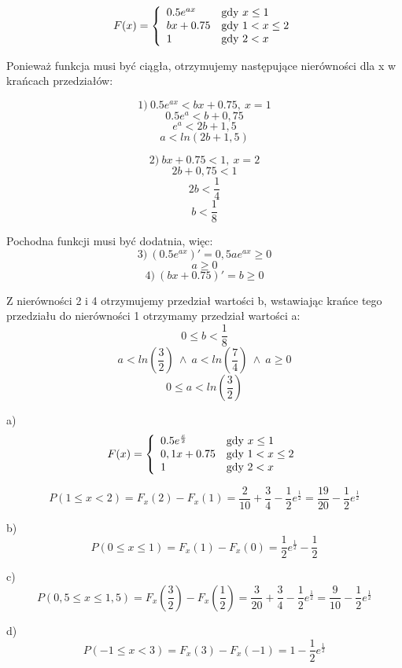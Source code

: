\medskip
{} 

$$
F(x)
 = \left\{ \begin{array}{ll}
0.5 e^{ax} & \textrm{gdy $x \leq 1$}\\
bx+0.75 & \textrm{gdy $ 1 < x \leq 2 $}\\
1 & \textrm{gdy $2 < x$}
\end{array} \right.
$$

Ponieważ funkcja musi być ciągła, otrzymujemy następujące nierówności dla x w krańcach przedziałów:

$$    
 1) \:0.5 e^{ax}<bx+0.75,\: x=1 $$
$$0.5 e^{a}<b+0,75$$
$$ e^{a}<2b+1,5$$
$$a<ln(2b+1,5)$$

$$2) \:bx+0.75<1,\: x=2$$
$$2b+0,75<1$$
$$2b<\frac{1}{4}$$
$$b<\frac{1}{8}$$

Pochodna funkcji musi być dodatnia, więc:
$$3) \: (0.5 e^{ax})' = 0,5a e^{ax} \geq 0$$
$$a\geq 0$$
$$4) \: (bx+0.75)'=b\geq 0$$

Z nierówności 2 i 4 otrzymujemy przedział wartości b, wstawiając krańce tego przedziału do nierówności 1 otrzymamy przedział wartości a:
$$ 0 \leq b <\frac{1}{8}$$
$$ a<ln(\frac{3}{2}) \: \wedge \:  a<ln(\frac{7}{4}) \: \wedge \: a \geq 0 $$
$$ 0 \leq a <ln(\frac{3}{2})$$

a)$$
F(x)
 = \left\{ \begin{array}{ll}
0.5 e^{\frac{x}{2}} & \textrm{gdy $x \leq 1$}\\
0,1x+0.75 & \textrm{gdy $ 1 < x \leq 2 $}\\
1 & \textrm{gdy $2 < x$}
\end{array} \right.
$$

$$P(1 \leq x< 2) = F_{x} (2) - F_{x} (1) = \frac {2}{10} + \frac{3}{4} - \frac{1}{2} e^{\frac{1}{2}}=
\frac{19}{20}-\frac{1}{2} e^{\frac{1}{2}}$$

b)
$$P(0 \leq x\leq 1) = F_{x} (1) - F_{x} (0) = \frac{1}{2} e^{\frac{1}{2}}-\frac{1}{2} $$

c)
$$P(0,5 \leq x \leq 1,5) = F_{x} (\frac{3}{2}) - F_{x} (\frac{1}{2}) = \frac {3}{20} + \frac{3}{4} - \frac{1}{2} e^{\frac{1}{2}}=
\frac{9}{10}-\frac{1}{2} e^{\frac{1}{2}}$$

d)
$$P(-1 \leq x< 3) = F_{x} (3) - F_{x} (-1) = 1-\frac{1}{2} e^{\frac{1}{2}} $$


